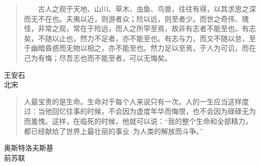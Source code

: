 \documentclass[main.tex]{subfiles}
\begin{document}
\begin{quote}
　　古人之观于天地、山川、草木、虫鱼、鸟兽，往往有得，以其求思之深而无不在也。夫夷以近，则游者众；险以远，则至者少。而世之奇伟、瑰怪，非常之观，常在于险远，而人之所罕至焉，故非有志者不能至也。有志矣，不随以止也，然力不足者，亦不能至也。有志与力，而又不随以怠，至于幽暗昏惑而无物以相之，亦不能至也。然力足以至焉，于人为可讥，而在己为有悔；尽吾志也而不能至者，可以无悔矣。
\end{quote}


\begin{flushright}
王安石\\
北宋
\end{flushright}


\begin{quote}
人最宝贵的是生命。生命对于每个人来说只有一次。人的一生应当这样度过：当他回忆往事的时候，不会因为虚度年华而悔恨，也不会因为碌碌无为而羞愧。这样，在临死的时候，他就可以说：“我的整个生命和全部精力，都已经献给了世界上最壮丽的事业--为人类的解放而斗争。” 
\end{quote}


\begin{flushright}
奥斯特洛夫斯基\\
前苏联
\end{flushright}
\end{document}
